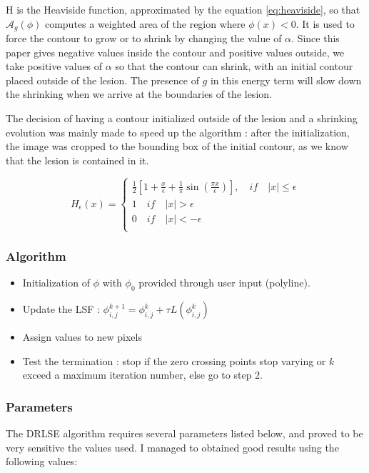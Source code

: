 \documentclass[a4paper,10pt]{article}
\begin{document}
H is the Heaviside function, approximated by the equation \ref{eq:heaviside}, so that $\mathcal{A}_g(\phi)$ computes a weighted area of the region where $\phi(x)<0$. It is used to force the contour to grow or to shrink by changing the value of $\alpha$. Since this paper gives negative values inside the contour and positive values outside, we take positive values of $\alpha$ so that the contour can shrink, with an initial contour placed outside of the lesion. The presence of $g$ in this energy term will slow down the shrinking when we arrive at the boundaries of the lesion.


The decision of having a contour initialized outside of the lesion and a shrinking evolution was mainly made to speed up the algorithm : after the initialization, the image was cropped to the bounding box of the initial contour, as we know that the lesion is contained in it.

\begin{equation}
H_\epsilon(x)= 
\begin{cases}
\frac{1}{2}[1+\frac{x}{\epsilon}+\frac{1}{\pi}\sin(\frac{\pi x}{\epsilon})], \quad if \quad |x| \leq \epsilon \\
1 \quad if \quad |x| > \epsilon \\
0 \quad if \quad |x| < -\epsilon \\
\end{cases}
\label{eq:heaviside}
\end{equation}

\subsubsection*{Algorithm}
\begin{itemize}
	\item Initialization of $\phi$ with $\phi_0$ provided through user input (polyline). 
	\item Update the LSF : $ \phi_{i,j}^{k+1}=\phi_{i,j}^k + \tau L(\phi_{i,j}^k)$
	\item Assign values to new pixels 
	\item Test the termination : stop if the zero crossing points stop varying or $k$ exceed a maximum iteration number, else go to step 2.
\end{itemize}

\subsubsection*{Parameters}
The DRLSE algorithm requires several parameters listed below, and proved to be very sensitive the values used. I managed to obtained good results using the following values:
\end{document}
